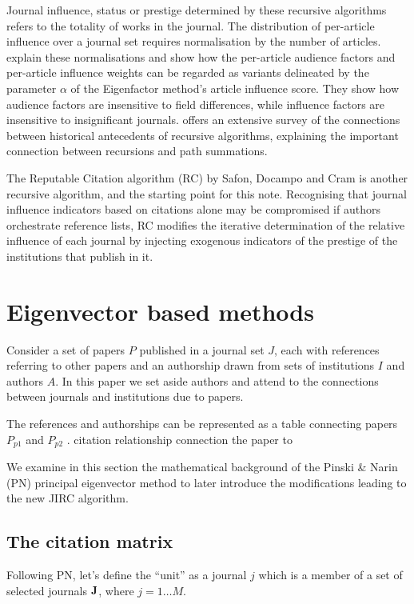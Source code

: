 \documentclass[10pt]{article}
\begin{document}
Journal influence, status or prestige determined by these recursive algorithms refers to the totality of works in the journal. The distribution of per-article influence over a journal set requires normalisation by the number of articles. \cite{waltmanRelationEigenfactorAudience2010} explain these normalisations and show how the per-article audience factors and per-article influence weights can be regarded as variants delineated by the parameter $\alpha$ of the Eigenfactor method's article influence score. They show how audience factors are insensitive to field differences, while influence factors are insensitive to insignificant journals. \citep{vigna} offers an extensive survey of the connections between historical antecedents of recursive algorithms, explaining the important connection between recursions and path summations.

The Reputable Citation algorithm (RC) by Safon, Docampo and Cram \citep{safon2025}  is another recursive algorithm, and the starting point for this note. Recognising that journal influence indicators based on citations alone may be compromised if authors orchestrate reference lists, RC modifies the iterative determination of the relative influence of each journal by injecting exogenous indicators of the prestige of the institutions that publish in it.

\section{Eigenvector based methods}

Consider a set of papers $P$ published in a journal set $J$, each with references referring to other papers and an authorship drawn from sets of institutions $I$ and authors $A$. In this paper we set aside authors and attend to the connections between journals and institutions due to papers. 


The references and authorships can be represented as a table connecting papers $P_{p1}$ and $P_{p2}$ . citation relationship connection the paper to 

We examine in this section the mathematical background of the Pinski \& Narin (PN) principal eigenvector method to later introduce the modifications leading to the new JIRC algorithm.
\subsection{The citation matrix}
Following PN, let's define the ``unit'' as a journal $j$ which is a member of a set of selected
journals $\bf{J}$, where $j = 1 \ldots M$.
\end{document}
